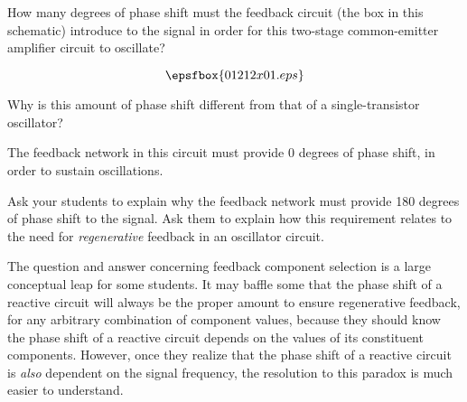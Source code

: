 

How many degrees of phase shift must the feedback circuit (the box in this schematic) introduce to the signal in order for this two-stage common-emitter amplifier circuit to oscillate?

$$\epsfbox{01212x01.eps}$$

Why is this amount of phase shift different from that of a single-transistor oscillator?







The feedback network in this circuit must provide 0 degrees of phase shift, in order to sustain oscillations.  







Ask your students to explain why the feedback network must provide 180 degrees of phase shift to the signal.  Ask them to explain how this requirement relates to the need for {\it regenerative} feedback in an oscillator circuit.

The question and answer concerning feedback component selection is a large conceptual leap for some students.  It may baffle some that the phase shift of a reactive circuit will always be the proper amount to ensure regenerative feedback, for any arbitrary combination of component values, because they should know the phase shift of a reactive circuit depends on the values of its constituent components.  However, once they realize that the phase shift of a reactive circuit is {\it also} dependent on the signal frequency, the resolution to this paradox is much easier to understand.




